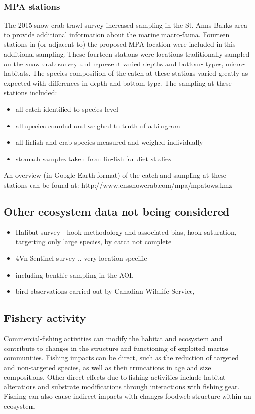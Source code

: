 \documentclass[letterpaper,portrait,11pt]{scrartcl}
\numberwithin{equation}{section}		%
\numberwithin{figure}{section}			%
\numberwithin{table}{section}				%
\begin{document}
\subsubsection{MPA stations}

The 2015 snow crab trawl survey increased sampling in the St. Anns Banks area to provide additional information about the marine macro-fauna. Fourteen stations in (or adjacent to) the proposed MPA location were included in this additional sampling. These fourteen stations were locations traditionally sampled on the snow crab survey and represent varied depths and bottom- types, micro-habitats. The species composition of the catch at these stations varied greatly as expected with differences in depth and bottom type. The sampling at these stations included:

\begin{itemize}
  \item all catch identified to species level
  \item all species counted and weighed to tenth of a kilogram
  \item all finfish and crab species measured and weighed individually
  \item stomach samples taken from fin-fish for diet studies
\end{itemize}

An overview (in Google Earth format) of the catch and sampling at these stations can be found at: http://www.enssnowcrab.com/mpa/mpatows.kmz

\subsection{Other ecosystem data not being considered}
\begin{itemize}
   \item Halibut survey - hook methodology and associated bias, hook saturation, targetting only large species, by catch not complete 
   \item 4Vn Sentinel survey .. very location specific
   \item including benthic sampling in the AOI, 
   \item bird observations carried out by Canadian Wildlife Service, 
\end{itemize}	
  
\clearpage

\subsection{Fishery activity}
Commercial-fishing activities can modify the habitat and ecosystem and contribute to changes in the structure and functioning of exploited marine communities.  Fishing impacts can be direct, such as the reduction of targeted and non-targeted species, as well as their truncations in age and size compositions.  Other direct effects due to fishing activities include habitat alterations and substrate modifications through interactions with fishing gear. Fishing can also cause indirect impacts with changes foodweb structure within an ecosystem.  
\end{document}
